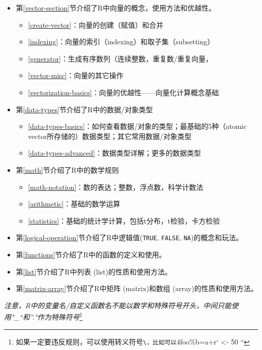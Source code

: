 \documentclass[]{book}
\providecommand{\tightlist}{%
  \setlength{\itemsep}{0pt}\setlength{\parskip}{0pt}}
\let\rmarkdownfootnote\footnote%
\def\footnote{\protect\rmarkdownfootnote}
\begin{document}
\begin{itemize}
\tightlist
\item
  第\ref{vector-section}节介绍了R中向量的概念，使用方法和优越性。

  \begin{itemize}
  \tightlist
  \item
    \ref{create-vector}：向量的创建（赋值）和合并
  \item
    \ref{indexing}：向量的索引（indexing）和取子集（subsetting）
  \item
    \ref{generator}：生成有序数列（连续整数，重复数/重复向量，
  \item
    \ref{vector-misc}：向量的其它操作
  \item
    \ref{vectorization-basics}：向量的优越性------向量化计算概念基础
  \end{itemize}
\item
  第\ref{data-types}节介绍了R中的数据/对象类型

  \begin{itemize}
  \tightlist
  \item
    \ref{data-types-basics}：如何查看数据/对象的类型；最基础的5种（atomic vector所存储的）数据类型；其它常用数据/对象类型
  \item
    \ref{data-types-advanced}：数据类型详解；更多的数据类型
  \end{itemize}
\item
  第\ref{math}节介绍了R中的数学规则

  \begin{itemize}
  \tightlist
  \item
    \ref{math-notation}：数的表达；整数，浮点数，科学计数法
  \item
    \ref{arithmetic}：基础的数学运算
  \item
    \ref{statistics}：基础的统计学计算，包括t分布，t检验，卡方检验
  \end{itemize}
\item
  第\ref{logical-operation}节介绍了R中逻辑值(\texttt{TRUE}, \texttt{FALSE}, \texttt{NA})的概念和玩法。
\item
  第\ref{functions}节介绍了R中的函数的定义和使用。
\item
  第\ref{list}节介绍了R中列表 (list)的性质和使用方法。
\item
  第\ref{matrix-array}节介绍了R中矩阵 (matrix)和数组 (array)的性质和使用方法。
\end{itemize}

\emph{注意，R中的变量名/自定义函数名不能以数字和特殊符号开头，中间只能使用"\_``和''."作为特殊符号}\footnote{如果一定要违反规则，可以使用转义符号\texttt{\textbackslash{}\textasciigrave{}\textasciigrave{}，比如可以\textasciigrave{}\textasciigrave{}}4foo\%b=a+r` \textless{}- 50 ``}
\end{document}
